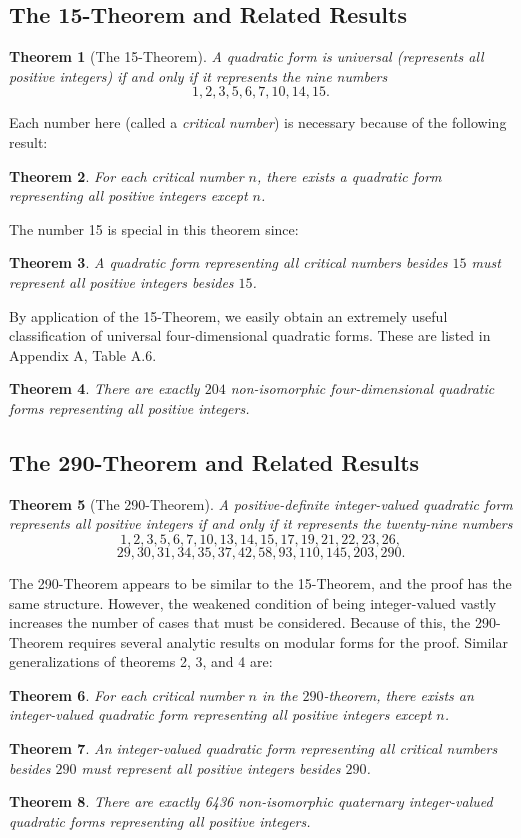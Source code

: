 \documentclass[letterpaper, 12pt]{article}
\newtheorem{thm}{Theorem}
\begin{document}
\subsection{The 15-Theorem and Related Results}
\begin{thm}[The 15-Theorem]\label{15thm}
    A quadratic form is universal (represents all positive integers) if and only if it represents the nine numbers
    \[1, 2, 3, 5, 6, 7, 10, 14, 15.\]
\end{thm}
Each number here (called a \emph{critical number}) is necessary because of the following result:
\begin{thm}\label{critnumsneeded}
    For each critical number $n$, there exists a quadratic form representing all positive integers except $n$.
\end{thm}
The number 15 is special in this theorem since:
\begin{thm}\label{15thmgeneral}
    A quadratic form representing all critical numbers besides $15$ must represent all positive integers besides $15$.
\end{thm}
By application of the 15-Theorem, we easily obtain an extremely useful classification of universal four-dimensional quadratic forms. These are listed in Appendix A, Table A.6.
\begin{thm}\label{universal 4d}
    There are exactly $204$ non-isomorphic four-dimensional quadratic forms representing all positive integers.
\end{thm}

\subsection{The 290-Theorem and Related Results}\label{section:290thm}
\begin{thm}[The 290-Theorem]\label{290thm}
    A positive-definite \emph{integer-valued} quadratic form represents all positive integers if and only if it represents the twenty-nine numbers
    \[1, 2, 3, 5, 6, 7, 10, 13, 14, 15, 17, 19, 21, 22, 23, 26,\]
    \[29, 30, 31, 34, 35, 37, 42, 58, 93, 110, 145, 203, 290.\]
\end{thm}
The 290-Theorem appears to be similar to the 15-Theorem, and the proof has the same structure. However, the weakened condition of being integer-valued vastly increases the number of cases that must be considered. Because of this, the 290-Theorem requires several analytic results on modular forms for the proof.
Similar generalizations of theorems 2, 3, and 4 are:
\begin{thm}\label{290critnumsneeded}
    For each critical number $n$ in the $290$-theorem, there exists an integer-valued quadratic form representing all positive integers except $n$.
\end{thm}
\begin{thm}\label{290thmgeneral}
    An integer-valued quadratic form representing all critical numbers besides $290$ must represent all positive integers besides $290$.
\end{thm}
\begin{thm}\label{290 universal 4d}
    There are exactly 6436 non-isomorphic quaternary integer-valued quadratic forms representing all positive integers.
\end{thm}
\end{document}
